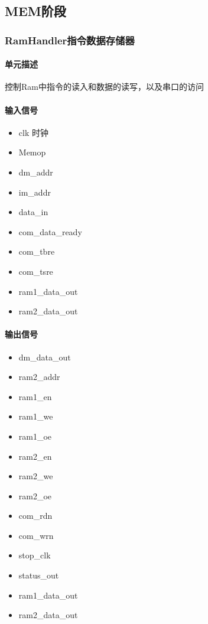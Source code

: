 \documentclass{article}
\begin{document}
		
\subsection{MEM阶段}
\label{subsec:mem}		
\subsubsection{RamHandler指令数据存储器}
		
\paragraph{单元描述}
控制Ram中指令的读入和数据的读写，以及串口的访问
		
\paragraph{输入信号}
		\begin{itemize}
			\item clk 时钟
			\item Memop 
			\item dm\_addr
			\item im\_addr 
			\item data\_in
			\item com\_data\_ready 
			\item com\_tbre
			\item com\_tsre 
			\item ram1\_data\_out
			\item ram2\_data\_out 
		\end{itemize}
		
\paragraph{输出信号}
		\begin{itemize}
			\item dm\_data\_out	
			\item ram2\_addr 
			\item ram1\_en
			\item ram1\_we 
			\item ram1\_oe
			\item ram2\_en 
			\item ram2\_we
			\item ram2\_oe 
			\item com\_rdn
			\item com\_wrn 
			\item stop\_clk
			\item status\_out 
			\item ram1\_data\_out
			\item ram2\_data\_out 
		\end{itemize}
		
\end{document}
